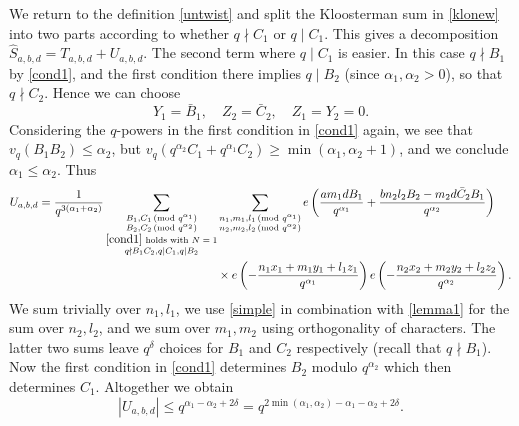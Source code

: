 \documentclass[11pt]{amsart}
\theoremstyle{plain}
\numberwithin{equation}{section}
\theoremstyle{definition}
\renewcommand{\geq}{\geqslant}
\renewcommand{\leq}{\leqslant}
\begin{document}
We return to the definition \eqref{untwist} and split the Kloosterman sum    in \eqref{klonew} into two parts according to whether $q \nmid C_1$ or $q \mid C_1$. This gives a decomposition  $\widehat{S}_{a, b, d} = T_{a, b, d} + U_{a, b, d}$. The second term where $q \mid C_1$ is easier. In this case $q \nmid B_1$ by \eqref{cond1}, and the first condition there implies   $q \mid B_2$ (since $\alpha_1, \alpha_2 > 0$), so that $q \nmid C_2$. Hence we can choose $$Y_1 = \bar{B}_1,  \quad Z_2 = \bar{C}_2,  \quad Z_1 = Y_2 = 0.$$ 
Considering the $q$-powers in the first condition in \eqref{cond1} again, we see that $v_q(B_1B_2) \leq \alpha_2$, but $v_q(q^{\alpha_2} C_1 + q^{\alpha_1}C_2) \geq \min(\alpha_1, \alpha_2 + 1)$, and we conclude $\alpha_1 \leq \alpha_2$. Thus  
\begin{displaymath}
\begin{split}
U_{a, b, d} = \frac{1}{q^{3(\alpha_1+\alpha_2)}} \sum_{\substack{B_1, C_1 \, (\text{mod }q^{\alpha_1})\\ B_2, C_2 \, (\text{mod }q^{\alpha_2})\\ \eqref{cond1} \text{ holds  with $N=1$}\\ q \nmid B_1C_2, q \mid C_1, q \mid B_2}} & \sum_{\substack{n_1, m_1, l_1 \,(\text{mod }q^{\alpha_1})\\ n_2, m_2, l_2 \,(\text{mod }q^{\alpha_2})}} e\left(\frac{am_1dB_1}{q^{\alpha_1}}+ \frac{bn_2l_2B_2 - m_2d\bar{C}_2 B_1}{q^{\alpha_2}}\right)\\
& \times e\left(-\frac{n_1x_1 + m_1y_1+l_1z_1}{q^{\alpha_1}}\right) e\left(-\frac{n_2x_2 + m_2y_2+l_2z_2}{q^{\alpha_2}}\right). 
\end{split}
\end{displaymath}
We sum trivially over $n_1, l_1$, we use \eqref{simple} in combination with \eqref{lemma1} for the sum over $n_2, l_2$, and we sum over $m_1, m_2$ using orthogonality of characters. The latter two sums leave $q^{\delta}$ choices for $B_1$ and $C_2$ respectively (recall that $q \nmid B_1$).   Now the first condition in \eqref{cond1} determines $B_2$ modulo $q^{\alpha_2}$ which then determines $C_1$.   Altogether we obtain
\begin{equation}\label{u}
|U_{a, b, d}|\leq q^{\alpha_1 - \alpha_2 + 2\delta} = q^{2\min(\alpha_1, \alpha_2) - \alpha_1 - \alpha_2 + 2\delta}.
\end{equation}\\
\end{document}
